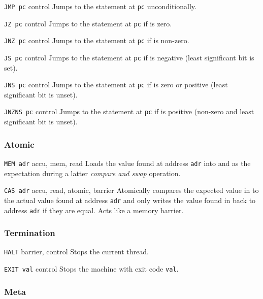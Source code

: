 {\lstinline[language={[concubine]Assembler}]{JMP pc}}
{control}
{Jumps to the statement at \texttt{pc} unconditionally.}

{\lstinline[language={[concubine]Assembler}]{JZ pc}}
{control}
{Jumps to the statement at \texttt{pc} if \ACCU{} is zero.}

{\lstinline[language={[concubine]Assembler}]{JNZ pc}}
{control}
{Jumps to the statement at \texttt{pc} if \ACCU{} is non-zero.}

{\lstinline[language={[concubine]Assembler}]{JS pc}}
{control}
{Jumps to the statement at \texttt{pc} if \ACCU{} is negative (least significant bit is set).}

{\lstinline[language={[concubine]Assembler}]{JNS pc}}
{control}
{Jumps to the statement at \texttt{pc} if \ACCU{} is zero or positive (least significant bit is unset).}

{\lstinline[language={[concubine]Assembler}]{JNZNS pc}}
{control}
{Jumps to the statement at \texttt{pc} if \ACCU{} is positive (non-zero and least significant bit is unset).}

\subsubsection{Atomic}

{\lstinline[language={[concubine]Assembler}]{MEM adr}}
{accu, mem, read}
{Loads the value found at address \texttt{adr} into \ACCU{} and \MEM{} as the expectation during a latter \emph{compare and swap} operation.}

{\lstinline[language={[concubine]Assembler}]{CAS adr}}
{accu, read, atomic, barrier}
{Atomically compares the expected value in \MEM{} to the actual value found at address \texttt{adr} and only writes the value found in \ACCU{} back to address \texttt{adr} if they are equal.
Acts like a memory barrier.}

\subsubsection{Termination}

{\lstinline[language={[concubine]Assembler}]{HALT}}
{barrier, control}
{Stops the current thread.}

{\lstinline[language={[concubine]Assembler}]{EXIT val}}
{control}
{Stops the machine with exit code \texttt{val}.}

\subsubsection{Meta}

